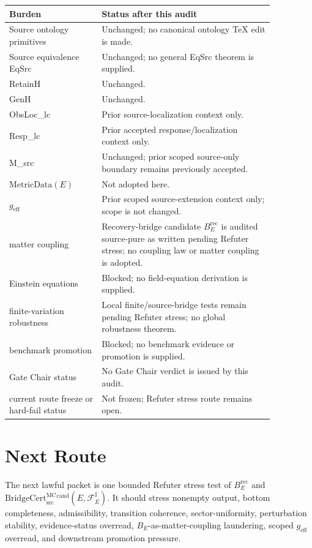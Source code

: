\documentclass[11pt]{article}
\newcommand{\geff}{g_{\mathrm{eff}}}
\newcommand{\MetricData}{\mathrm{MetricData}}
\newcommand{\BridgeCert}{\mathrm{BridgeCert}_{\mathrm{src}}^{\mathrm{MC}}}
\newcommand{\BErec}{B_E^{\mathrm{rec}}}
\begin{document}
\begin{longtable}{p{0.30\linewidth}p{0.56\linewidth}}
\toprule
Burden & Status after this audit \\
\midrule
Source ontology primitives & Unchanged; no canonical ontology TeX edit is made. \\
Source equivalence EqSrc & Unchanged; no general EqSrc theorem is supplied. \\
RetainH & Unchanged. \\
GenH & Unchanged. \\
ObsLoc\_lc & Prior source-localization context only. \\
Resp\_lc & Prior accepted response/localization context only. \\
M\_src & Unchanged; prior scoped source-only boundary remains previously accepted. \\
\(\MetricData(E)\) & Not adopted here. \\
\(\geff\) & Prior scoped source-extension context only; scope is not changed. \\
matter coupling & Recovery-bridge candidate \(\BErec\) is audited source-pure as written pending Refuter stress; no coupling law or matter coupling is adopted. \\
Einstein equations & Blocked; no field-equation derivation is supplied. \\
finite-variation robustness & Local finite/source-bridge tests remain pending Refuter stress; no global robustness theorem. \\
benchmark promotion & Blocked; no benchmark evidence or promotion is supplied. \\
Gate Chair status & No Gate Chair verdict is issued by this audit. \\
current route freeze or hard-fail status & Not frozen; Refuter stress route remains open. \\
\bottomrule
\end{longtable}

\section{Next Route}

The next lawful packet is one bounded Refuter stress test of
\(\BErec\) and \(\BridgeCert^{\mathrm{cand}}(E,\mathcal{F}_E^\sharp)\).
It should stress nonempty output, bottom completeness, admissibility,
transition coherence, sector-uniformity, perturbation stability,
evidence-status overread, \(B_E\)-as-matter-coupling laundering, scoped
\(\geff\) overread, and downstream promotion pressure.
\end{document}
